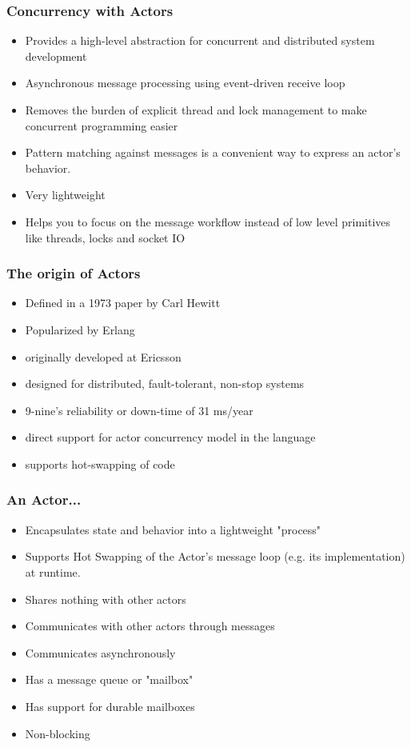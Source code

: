 \documentclass{beamer}
\begin{document}
\frame
    {
      \frametitle{Concurrency with Actors}
      \begin{itemize}
      \item Provides a high-level abstraction for concurrent and distributed
        system development
      \item  Asynchronous message processing using event-driven
        receive loop
      \item Removes the burden of explicit thread and lock management to
        make concurrent programming easier
      \item Pattern matching
        against messages is a convenient way to express an actor's
        behavior.
      \item Very lightweight
      \item Helps you to focus on the message workflow instead of
        low level primitives like threads, locks and socket IO
      \end{itemize}
    }



\frame
    {
      \frametitle{The origin of Actors}
      \begin{itemize}
      \item Defined in a 1973 paper by Carl Hewitt

      \item Popularized by Erlang

      \item originally developed at Ericsson
      \item  designed for distributed, fault-tolerant, non-stop systems
      \item 9-nine's reliability or down-time of 31 ms/year
      \item direct support for actor concurrency model in the language
      \item supports hot-swapping of code
      \end{itemize}
    }




\frame
{
  \frametitle{An Actor...}

  \begin{itemize}
  \item Encapsulates state and behavior into a lightweight "process"
  \item Supports Hot Swapping of the Actor’s message loop (e.g. its implementation) at runtime. 
  \item Shares nothing with other actors
  \item Communicates with other actors through messages 
  \item Communicates asynchronously
  \item Has a message queue or "mailbox"
  \item Has support for durable mailboxes
  \item Non-blocking
  \end{itemize}
}
\end{document}
